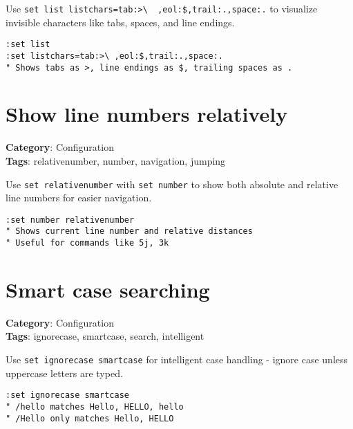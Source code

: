 Use {\footnotesize \Verb§set list listchars=tab:>\  ,eol:$,trail:.,space:.§} to visualize invisible characters like tabs, spaces, and line endings.

\begin{Exa*}{}
\begin{Verbatim}[fontsize=\footnotesize, breaklines, breakanywhere]
:set list
:set listchars=tab:>\ ,eol:$,trail:.,space:.
" Shows tabs as >, line endings as $, trailing spaces as .
\end{Verbatim}
\end{Exa*}

\section{Show line numbers relatively}

\textbf{Category}: Configuration\\ \textbf{Tags}: relativenumber, number, navigation, jumping
\vspace{0.5cm}

Use {\footnotesize \Verb§set relativenumber§} with {\footnotesize \Verb§set number§} to show both absolute and relative line numbers for easier navigation.

\begin{Exa*}{}
\begin{Verbatim}[fontsize=\footnotesize, breaklines, breakanywhere]
:set number relativenumber
" Shows current line number and relative distances
" Useful for commands like 5j, 3k
\end{Verbatim}
\end{Exa*}

\section{Smart case searching}

\textbf{Category}: Configuration\\ \textbf{Tags}: ignorecase, smartcase, search, intelligent
\vspace{0.5cm}

Use {\footnotesize \Verb§set ignorecase smartcase§} for intelligent case handling - ignore case unless uppercase letters are typed.

\begin{Exa*}{}
\begin{Verbatim}[fontsize=\footnotesize, breaklines, breakanywhere]
:set ignorecase smartcase
" /hello matches Hello, HELLO, hello
" /Hello only matches Hello, HELLO
\end{Verbatim}
\end{Exa*}

